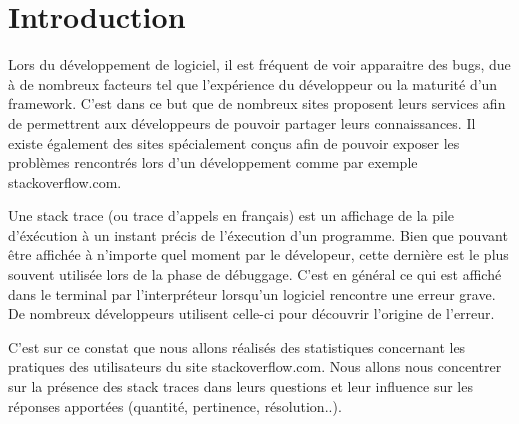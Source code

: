 \section{Introduction}
Lors du développement de logiciel, il est fréquent de voir apparaitre des bugs, due à de nombreux facteurs tel que l'expérience du développeur ou la maturité d'un framework. C'est dans ce but que de nombreux sites proposent leurs services afin de permettrent aux développeurs de pouvoir partager leurs connaissances. Il existe également des sites spécialement conçus afin de pouvoir exposer les problèmes rencontrés lors d'un développement comme par exemple stackoverflow.com. 

Une stack trace (ou trace d'appels en français) est un affichage de la pile d'éxécution à un instant précis de l'éxecution d'un programme. Bien que pouvant être affichée à n'importe quel moment par le dévelopeur, cette dernière est le plus souvent utilisée lors de la phase de débuggage. C'est en général ce qui est affiché dans le terminal par l'interpréteur lorsqu'un logiciel rencontre une erreur grave. De nombreux développeurs utilisent celle-ci pour découvrir l'origine de l'erreur. 

C'est sur ce constat que nous allons réalisés des statistiques concernant les pratiques des utilisateurs du site stackoverflow.com. Nous allons nous concentrer sur la présence des stack traces dans leurs questions et leur influence sur les réponses apportées (quantité, pertinence, résolution..).

